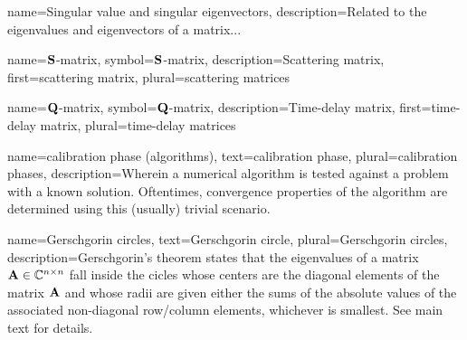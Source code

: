 
%
{%
  name={Singular value and singular eigenvectors},
  description={Related to the eigenvalues and eigenvectors of a matrix...}
}

%
{%
  name={$\mathbf{S}$-matrix},
  symbol={$\mathbf{S}$-matrix},
  description={Scattering matrix},
  first={scattering matrix},
  plural={scattering matrices}
}

%
{%
  name={$\mathbf{Q}$-matrix},
  symbol={$\mathbf{Q}$-matrix},
  description={Time-delay matrix},
  first={time-delay matrix},
  plural={time-delay matrices}
}

%
{%
  name={calibration phase (algorithms)},
  text={calibration phase},
  plural={calibration phases},
  description={Wherein a numerical algorithm is tested against a problem with a%
		known solution. Oftentimes, convergence properties of the algorithm
		are determined using this (usually) trivial scenario.}
}

%
{%
  name={Gerschgorin circles},
  text={Gerschgorin circle},
  plural={Gerschgorin circles},
  description={Gerschgorin's theorem states that the eigenvalues of a matrix $\mathbf{A}\in\mathbb{C}^{n\times n}$ %
		fall inside the cicles whose centers are the diagonal elements of the matrix $\mathbf{A}$ and whose
		radii are given either the sums of the absolute values of the associated non-diagonal row/column elements,
		whichever is smallest. See main text for details.}
}
  